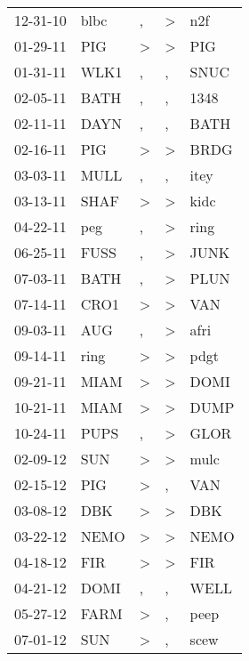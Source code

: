 \begin{supertabular}{lllll}
 12-31-10 &   blbc &             , &  \textgreater &    n2f \\
 01-29-11 &    PIG &  \textgreater &  \textgreater &    PIG \\
 01-31-11 &   WLK1 &             , &             , &   SNUC \\
 02-05-11 &   BATH &             , &             , &   1348 \\
 02-11-11 &   DAYN &             , &             , &   BATH \\
 02-16-11 &    PIG &  \textgreater &  \textgreater &   BRDG \\
 03-03-11 &   MULL &             , &             , &   itey \\
 03-13-11 &   SHAF &  \textgreater &  \textgreater &   kidc \\
 04-22-11 &    peg &             , &  \textgreater &   ring \\
 06-25-11 &   FUSS &             , &  \textgreater &   JUNK \\
 07-03-11 &   BATH &             , &  \textgreater &   PLUN \\
 07-14-11 &   CRO1 &  \textgreater &  \textgreater &    VAN \\
 09-03-11 &    AUG &             , &  \textgreater &   afri \\
 09-14-11 &   ring &  \textgreater &  \textgreater &   pdgt \\
 09-21-11 &   MIAM &  \textgreater &  \textgreater &   DOMI \\
 10-21-11 &   MIAM &  \textgreater &  \textgreater &   DUMP \\
 10-24-11 &   PUPS &             , &  \textgreater &   GLOR \\
 02-09-12 &    SUN &  \textgreater &  \textgreater &   mulc \\
 02-15-12 &    PIG &  \textgreater &             , &    VAN \\
 03-08-12 &    DBK &  \textgreater &  \textgreater &    DBK \\
 03-22-12 &   NEMO &  \textgreater &  \textgreater &   NEMO \\
 04-18-12 &    FIR &  \textgreater &  \textgreater &    FIR \\
 04-21-12 &   DOMI &             , &             , &   WELL \\
 05-27-12 &   FARM &  \textgreater &             , &   peep \\
 07-01-12 &    SUN &  \textgreater &             , &   scew \\

\end{supertabular}
